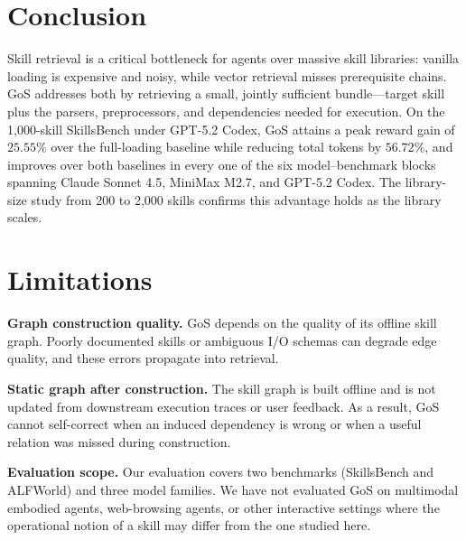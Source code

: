 \section{Conclusion}
Skill retrieval is a critical bottleneck for agents over massive skill libraries: vanilla loading is expensive and noisy, while vector retrieval misses prerequisite chains.
%
GoS addresses both by retrieving a small, jointly sufficient bundle---target skill plus the parsers, preprocessors, and dependencies needed for execution.
%
On the 1{,}000-skill SkillsBench under GPT-5.2 Codex, GoS attains a peak reward gain of $25.55\%$ over the full-loading baseline while reducing total tokens by $56.72\%$, and improves over both baselines in every one of the six model--benchmark blocks spanning Claude Sonnet 4.5, MiniMax M2.7, and GPT-5.2 Codex.
%
The library-size study from 200 to 2{,}000 skills confirms this advantage holds as the library scales.



\section*{Limitations}

\noindent\textbf{Graph construction quality.} GoS depends on the quality of its offline skill graph. Poorly documented skills or ambiguous I/O schemas can degrade edge quality, and these errors propagate into retrieval.

\noindent\textbf{Static graph after construction.} The skill graph is built offline and is not updated from downstream execution traces or user feedback. As a result, GoS cannot self-correct when an induced dependency is wrong or when a useful relation was missed during construction.

\noindent\textbf{Evaluation scope.} Our evaluation covers two benchmarks (SkillsBench and ALFWorld) and three model families. We have not evaluated GoS on multimodal embodied agents, web-browsing agents, or other interactive settings where the operational notion of a skill may differ from the one studied here.


